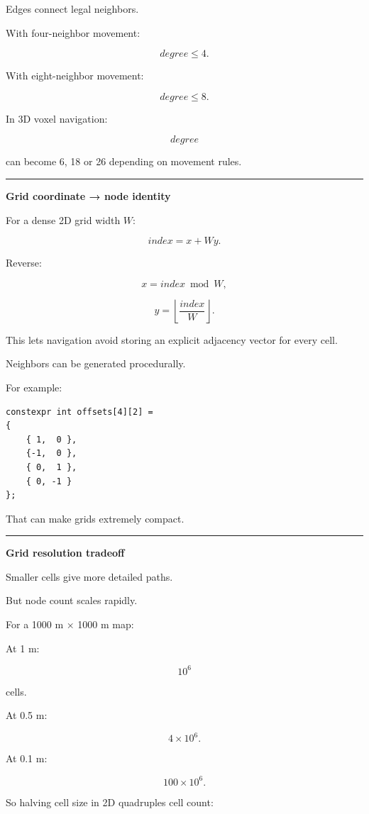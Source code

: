 Edges connect legal neighbors.

With four-neighbor movement:

\[
degree\le4.
\]

With eight-neighbor movement:

\[
degree\le8.
\]

In 3D voxel navigation:

\[
degree
\]

can become 6, 18 or 26 depending on movement rules.

\begin{center}\rule{0.5\linewidth}{0.5pt}\end{center}

\textbf{Grid coordinate → node identity}

For a dense 2D grid width \(W\):

\[
index=x+Wy.
\]

Reverse:

\[
x=index\bmod W,
\]

\[
y=\left\lfloor
\frac{index}{W}
\right\rfloor.
\]

This lets navigation avoid storing an explicit adjacency vector for every cell.

Neighbors can be generated procedurally.

For example:

\begin{verbatim}
constexpr int offsets[4][2] =
{
    { 1,  0 },
    {-1,  0 },
    { 0,  1 },
    { 0, -1 }
};
\end{verbatim}

That can make grids extremely compact.

\begin{center}\rule{0.5\linewidth}{0.5pt}\end{center}

\textbf{Grid resolution tradeoff}

Smaller cells give more detailed paths.

But node count scales rapidly.

For a 1000 m × 1000 m map:

At 1 m:

\[
10^6
\]

cells.

At 0.5 m:

\[
4\times10^6.
\]

At 0.1 m:

\[
100\times10^6.
\]

So halving cell size in 2D quadruples cell count:

